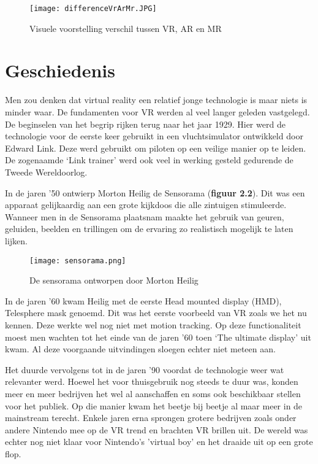 \begin{figure}[h]
    \centering
    \texttt{[image: differenceVrArMr.JPG]}
    \caption{Visuele voorstelling verschil tussen VR, AR en MR \autocite{Barel2017}}
\end{figure}

\section{Geschiedenis}

Men zou denken dat virtual reality een relatief jonge technologie is maar niets is minder waar. De fundamenten voor VR werden al veel langer geleden vastgelegd. De beginselen van het begrip rijken terug naar het jaar 1929. Hier werd de technologie voor de eerste keer gebruikt in een vluchtsimulator ontwikkeld door Edward Link. Deze werd gebruikt om piloten op een veilige manier op te leiden. De zogenaamde ‘Link trainer’ werd ook veel in werking gesteld gedurende de Tweede Wereldoorlog.


In de jaren ’50 ontwierp Morton Heilig de Sensorama (\textbf{figuur 2.2}). Dit was een apparaat gelijkaardig aan een grote kijkdoos die alle zintuigen stimuleerde. Wanneer men in de Sensorama plaatsnam maakte het gebruik van geuren, geluiden, beelden en trillingen om de ervaring zo realistisch mogelijk te laten lijken. 

\begin{figure}[h]
    \centering
    \texttt{[image: sensorama.png]}
    \caption{De sensorama ontworpen door Morton Heilig \autocite{Society2019}}
\end{figure}

In de jaren ’60 kwam Heilig met de eerste Head mounted display (HMD), Telesphere mask genoemd. Dit was het eerste voorbeeld van VR zoals we het nu kennen. Deze werkte wel nog niet met motion tracking.
Op deze functionaliteit moest men wachten tot het einde van de jaren ’60 toen ‘The ultimate display’ uit kwam.
Al deze voorgaande uitvindingen sloegen echter niet meteen aan.

Het duurde vervolgens tot in de jaren ’90 voordat de technologie weer wat relevanter werd. Hoewel het voor thuisgebruik nog steeds te duur was, konden meer en meer bedrijven het wel al aanschaffen en soms ook beschikbaar stellen voor het publiek. Op die manier kwam het beetje bij beetje al maar meer in de mainstream terecht. Enkele jaren erna sprongen grotere bedrijven zoals onder andere Nintendo mee op de VR trend en brachten VR brillen uit. De wereld was echter nog niet klaar voor Nintendo's 'virtual boy' en het draaide uit op een grote flop. 

